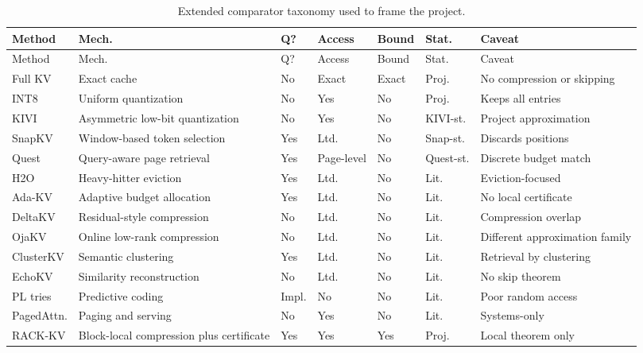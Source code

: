 \begin{center}
\footnotesize
\setlength{\tabcolsep}{2pt}
\begin{longtable}{@{}>{\raggedright\arraybackslash}p{1.58cm}>{\raggedright\arraybackslash}p{1.65cm}>{\raggedright\arraybackslash}p{0.82cm}>{\raggedright\arraybackslash}p{0.92cm}>{\raggedright\arraybackslash}p{0.88cm}>{\raggedright\arraybackslash}p{1.0cm}>{\raggedright\arraybackslash}p{3.08cm}@{}}
\caption{Extended comparator taxonomy used to frame the project.}\label{tab:taxonomy}\\
\toprule
Method & Mech. & Q? & Access & Bound & Stat. & Caveat \\
\midrule
\endfirsthead
\toprule
Method & Mech. & Q? & Access & Bound & Stat. & Caveat \\
\midrule
\endhead
Full KV & Exact cache & No & Exact & Exact & Proj. & No compression or skipping \\
INT8 & Uniform quantization & No & Yes & No & Proj. & Keeps all entries \\
KIVI & Asymmetric low-bit quantization & No & Yes & No & KIVI-st. & Project approximation \\
SnapKV & Window-based token selection & Yes & Ltd. & No & Snap-st. & Discards positions \\
Quest & Query-aware page retrieval & Yes & Page-level & No & Quest-st. & Discrete budget match \\
H2O & Heavy-hitter eviction & Yes & Ltd. & No & Lit. & Eviction-focused \\
Ada-KV & Adaptive budget allocation & Yes & Ltd. & No & Lit. & No local certificate \\
DeltaKV & Residual-style compression & No & Ltd. & No & Lit. & Compression overlap \\
OjaKV & Online low-rank compression & No & Ltd. & No & Lit. & Different approximation family \\
ClusterKV & Semantic clustering & Yes & Ltd. & No & Lit. & Retrieval by clustering \\
EchoKV & Similarity reconstruction & No & Ltd. & No & Lit. & No skip theorem \\
PL tries & Predictive coding & Impl. & No & No & Lit. & Poor random access \\
PagedAttn. & Paging and serving & No & Yes & No & Lit. & Systems-only \\
RACK-KV & Block-local compression plus certificate & Yes & Yes & Yes & Proj. & Local theorem only \\
\bottomrule
\end{longtable}
\end{center}
